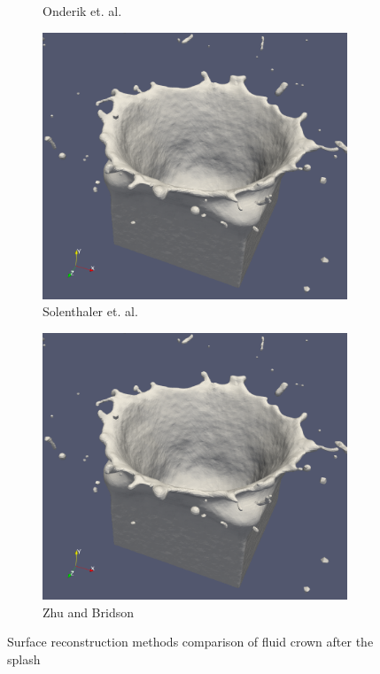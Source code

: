 \begin{figure}
\begin{center}
\begin{subfigure}[b]{0.48\textwidth}
			\caption{Onderik et. al.}
		\end{subfigure}
		\begin{subfigure}[b]{0.48\textwidth}
			\includegraphics[width=\textwidth]{figures/SolenthalerEtAlForRelWorkCrown.png}
			\caption{Solenthaler et. al.}
		\end{subfigure}
		\begin{subfigure}[b]{0.48\textwidth}
			\includegraphics[width=\textwidth]{figures/ZhuBridsonForRelatedWorksCrown.png}
			\caption{Zhu and Bridson}
		\end{subfigure}

	\end{center}
	\caption{Surface reconstruction methods comparison of fluid crown after the splash}
	\label{fig:crown_comparison}
\end{figure}
